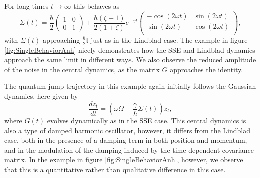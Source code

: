 \documentclass[12pt]{iopart} %
\begin{document}
For long times $t\to\infty$ this behaves as 
\begin{equation}
    \Sigma(t)=\frac{\hbar}{2}\begin{pmatrix}1&0\\0&1\end{pmatrix}+\frac{\hbar (\zeta -1)}{2(1+\zeta)} e^{-\gamma t}\begin{pmatrix}
 - \cos (2 \omega t) & \sin (2 \omega t) \\
  \sin (2  \omega t) & \cos (2 \omega t) \\
\end{pmatrix},
\end{equation}
with $\Sigma(t)$ approaching $\frac{\hbar}{2}\mathbb{I}$ just as in the Lindblad case. The example in figure \ref{fig:SingleBehaviorAnh} nicely demonstrates how the SSE and Lindblad dynamics approach the same limit in different ways. We also observe the reduced amplitude of the noise in the central dynamics, as the matrix $G$ approaches the identity.   

The quantum jump trajectory in this example again initially follows the Gaussian dynamics, here given by
\begin{equation}
  \frac{d  z_t}{d t}=\left(\omega \Omega  -\frac{\gamma}{\hbar} \Sigma(t)\right) z_t,
\end{equation} 
where $G(t)$ evolves dynamically as in the SSE case. This central dynamics is also a type of damped harmonic oscillator, however, it differs from the Lindblad case, both in the presence of a damping term in both position and momentum, and in the modulation of the damping induced by the time-dependent covariance matrix. In the example in figure \ref{fig:SingleBehaviorAnh}, however, we observe that this is a quantitative rather than qualitative difference in this case. 
\end{document}
